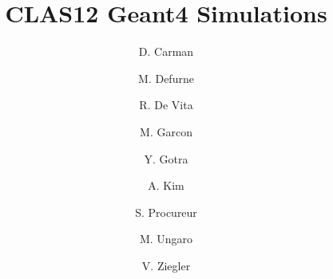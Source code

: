 \title{CLAS12 Geant4 Simulations}



\author[C]{D. Carman}
\author[C]{M. Defurne}
\author[B]{R. De Vita}
\author[C]{M. Garcon}
\author[A]{Y. Gotra}
\author[D]{A. Kim}
\author[C]{S. Procureur}
\author[A]{M. Ungaro}
\author[A]{V. Ziegler}

\address[A]{Thomas Jefferson National Accelerator Facility, Newport News, VA, USA}
\address[B]{Istituto Nazionale Di Fisica Nucleare, Genova, Italy}
\address[C]{IRFU, CEA, Universit\`e Paris-Saclay, F-91191 Gif-sur-Yvette, France}
\address[D]{University of Connecticut, Storrs, Connecticut}
